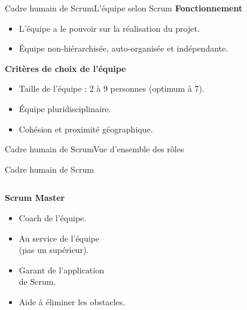 \begin{frame}{Cadre humain de Scrum}{L'équipe selon Scrum}
    \textbf{Fonctionnement}

    \begin{itemize}
        \item L'équipe a le pouvoir sur la réalisation du projet.
        \item Équipe non-hiérarchisée, auto-organisée et indépendante.
    \end{itemize}

    \pause
    \vfill
    \textbf{Critères de choix de l'équipe}

    \begin{itemize}
        \item Taille de l'équipe : 2 à 9 personnes (optimum à 7).
        \item Équipe pluridisciplinaire.
        \item Cohésion et proximité géographique.
    \end{itemize}
\end{frame}

\begin{frame}{Cadre humain de Scrum}{Vue d'ensemble des rôles}
    
\end{frame}

\begin{frame}{Cadre humain de Scrum}
\begin{columns}
    \begin{column}{.4\textwidth}
        \hspace{2em}\textbf{Scrum Master}
        \begin{itemize}
            \item Coach de l'équipe.
            \item Au service de l'équipe\\(pas un supérieur).
            \item Garant de l'application\\de Scrum.
            \item Aide à éliminer les obstacles.
        \end{itemize}
    \end{column}%
    \begin{column}{.6\textwidth}
        \newcommand{\scrumfocus}{sm}
        
    \end{column}
\end{columns}
\end{frame}

